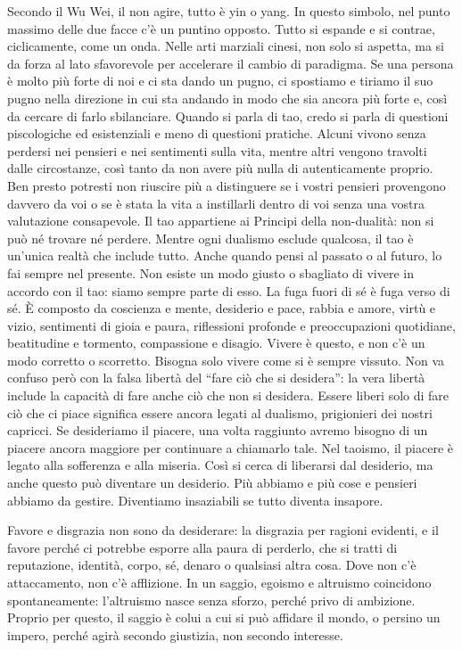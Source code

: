 \documentclass[12pt]{book} %
\begin{document}
Secondo il Wu Wei, il non agire, tutto è yin o yang. In questo simbolo, nel punto massimo delle due facce c'è un puntino opposto. Tutto si espande e si contrae, ciclicamente, come un onda. Nelle arti marziali cinesi, non solo si aspetta, ma si da forza al lato sfavorevole per accelerare il cambio di paradigma. Se una persona è molto più forte di noi e ci sta dando un pugno, ci spostiamo e tiriamo il suo pugno nella direzione in cui sta andando in modo che sia ancora più forte e, così da cercare di farlo sbilanciare. Quando si parla di tao, credo si parla di questioni piscologiche ed esistenziali e meno di questioni pratiche. 
Alcuni vivono senza perdersi nei pensieri e nei sentimenti sulla vita, mentre altri vengono travolti dalle circostanze, così tanto da non avere più nulla di autenticamente proprio. Ben presto potresti non riuscire più a distinguere se i vostri pensieri provengono davvero da voi o se è stata la vita a instillarli dentro di voi senza una vostra valutazione consapevole. 
Il tao appartiene ai Principi della non-dualità: non si può né trovare né perdere. Mentre ogni dualismo esclude qualcosa, il tao è un'unica realtà che include tutto. Anche quando pensi al passato o al futuro, lo fai sempre nel presente. Non esiste un modo giusto o sbagliato di vivere in accordo con il tao: siamo sempre parte di esso. La fuga fuori di sé è fuga verso di sé.
È composto da coscienza e mente, desiderio e pace, rabbia e amore, virtù e vizio, sentimenti di gioia e paura, riflessioni profonde e preoccupazioni quotidiane, beatitudine e tormento, compassione e disagio. Vivere è questo, e non c’è un modo corretto o scorretto. Bisogna solo vivere come si è sempre vissuto.
Non va confuso però con la falsa libertà del “fare ciò che si desidera”: la vera libertà include la capacità di fare anche ciò che non si desidera. Essere liberi solo di fare ciò che ci piace significa essere ancora legati al dualismo, prigionieri dei nostri capricci.
Se desideriamo il piacere, una volta raggiunto avremo bisogno di un piacere ancora maggiore per continuare a chiamarlo tale. Nel taoismo, il piacere è legato alla sofferenza e alla miseria. Così si cerca di liberarsi dal desiderio, ma anche questo può diventare un desiderio. Più abbiamo e più cose e pensieri abbiamo da gestire. Diventiamo insaziabili se tutto diventa insapore.

Favore e disgrazia non sono da desiderare: la disgrazia per ragioni evidenti, e il favore perché ci potrebbe esporre alla paura di perderlo, che si tratti di reputazione, identità, corpo, sé, denaro o qualsiasi altra cosa.
Dove non c'è attaccamento, non c'è afflizione.
In un saggio, egoismo e altruismo coincidono spontaneamente: l’altruismo nasce senza sforzo, perché privo di ambizione.
Proprio per questo, il saggio è colui a cui si può affidare il mondo, o persino un impero, perché agirà secondo giustizia, non secondo interesse.
\end{document}
